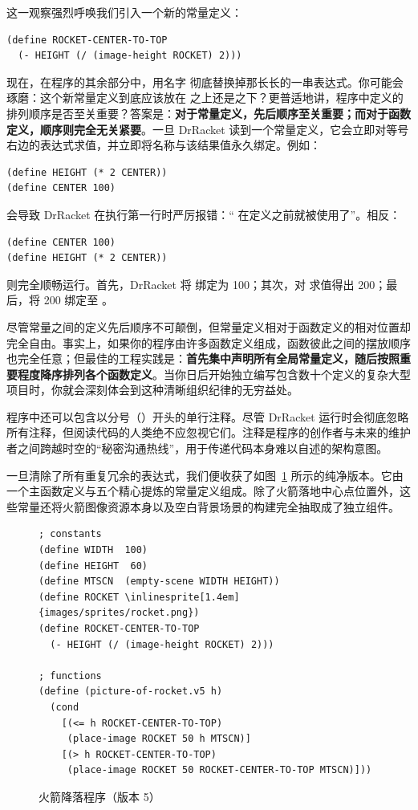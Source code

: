 这一观察强烈呼唤我们引入一个新的常量定义：
\begin{lstlisting}[language=BSL]
(define ROCKET-CENTER-TO-TOP
  (- HEIGHT (/ (image-height ROCKET) 2)))
\end{lstlisting}

现在，在程序的其余部分中，用名字  彻底替换掉那长长的一串表达式。你可能会琢磨：这个新常量定义到底应该放在  之上还是之下？更普适地讲，程序中定义的排列顺序是否至关重要？答案是：\textbf{对于常量定义，先后顺序至关重要；而对于函数定义，顺序则完全无关紧要}。一旦 DrRacket 读到一个常量定义，它会立即对等号右边的表达式求值，并立即将名称与该结果值永久绑定。例如：
\begin{lstlisting}[language=BSL]
(define HEIGHT (* 2 CENTER))
(define CENTER 100)
\end{lstlisting}
会导致 DrRacket 在执行第一行时严厉报错：“ 在定义之前就被使用了”。相反：
\begin{lstlisting}[language=BSL]
(define CENTER 100)
(define HEIGHT (* 2 CENTER))
\end{lstlisting}
则完全顺畅运行。首先，DrRacket 将  绑定为 100；其次，对  求值得出 200；最后，将 200 绑定至 。

尽管常量之间的定义先后顺序不可颠倒，但常量定义相对于函数定义的相对位置却完全自由。事实上，如果你的程序由许多函数定义组成，函数彼此之间的摆放顺序也完全任意；但最佳的工程实践是：\textbf{首先集中声明所有全局常量定义，随后按照重要程度降序排列各个函数定义}。当你日后开始独立编写包含数十个定义的复杂大型项目时，你就会深刻体会到这种清晰组织纪律的无穷益处。

\begin{notebox}[关于代码注释]
程序中还可以包含以分号（\code{;}）开头的单行注释。尽管 DrRacket 运行时会彻底忽略所有注释，但阅读代码的人类绝不应忽视它们。注释是程序的创作者与未来的维护者之间跨越时空的“秘密沟通热线”，用于传递代码本身难以自述的架构意图。
\end{notebox}

一旦清除了所有重复冗余的表达式，我们便收获了如图~\ref{fig:rocket_v5} 所示的纯净版本。它由一个主函数定义与五个精心提炼的常量定义组成。除了火箭落地中心点位置外，这些常量还将火箭图像资源本身以及空白背景场景的构建完全抽取成了独立组件。

\begin{figure}[htbp]
  \centering
\begin{stepperbox}[unbreakable]
\begin{Verbatim}[commandchars=\\\{\}, fontsize=\scriptsize]
; constants
(define WIDTH  100)
(define HEIGHT  60)
(define MTSCN  (empty-scene WIDTH HEIGHT))
(define ROCKET \inlinesprite[1.4em]{images/sprites/rocket.png})
(define ROCKET-CENTER-TO-TOP
  (- HEIGHT (/ (image-height ROCKET) 2)))

; functions
(define (picture-of-rocket.v5 h)
  (cond
    [(<= h ROCKET-CENTER-TO-TOP)
     (place-image ROCKET 50 h MTSCN)]
    [(> h ROCKET-CENTER-TO-TOP)
     (place-image ROCKET 50 ROCKET-CENTER-TO-TOP MTSCN)]))
\end{Verbatim}
\end{stepperbox}
  \caption{火箭降落程序（版本 5）}
  \label{fig:rocket_v5}
\end{figure}

